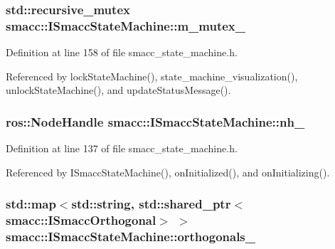 \subsubsection[{\texorpdfstring{m\+\_\+mutex\+\_\+}{m_mutex_}}]{\setlength{\rightskip}{0pt plus 5cm}std\+::recursive\+\_\+mutex smacc\+::\+I\+Smacc\+State\+Machine\+::m\+\_\+mutex\+\_\+\hspace{0.3cm}{\ttfamily [private]}}\hypertarget{classsmacc_1_1ISmaccStateMachine_aac785541646e5c517273bf31072505a1}{}\label{classsmacc_1_1ISmaccStateMachine_aac785541646e5c517273bf31072505a1}


Definition at line 158 of file smacc\+\_\+state\+\_\+machine.\+h.



Referenced by lock\+State\+Machine(), state\+\_\+machine\+\_\+visualization(), unlock\+State\+Machine(), and update\+Status\+Message().

\subsubsection[{\texorpdfstring{nh\+\_\+}{nh_}}]{\setlength{\rightskip}{0pt plus 5cm}ros\+::\+Node\+Handle smacc\+::\+I\+Smacc\+State\+Machine\+::nh\+\_\+\hspace{0.3cm}{\ttfamily [protected]}}\hypertarget{classsmacc_1_1ISmaccStateMachine_ad8877bcca9dbb345fe72cca839c93dd3}{}\label{classsmacc_1_1ISmaccStateMachine_ad8877bcca9dbb345fe72cca839c93dd3}


Definition at line 137 of file smacc\+\_\+state\+\_\+machine.\+h.



Referenced by I\+Smacc\+State\+Machine(), on\+Initialized(), and on\+Initializing().

\subsubsection[{\texorpdfstring{orthogonals\+\_\+}{orthogonals_}}]{\setlength{\rightskip}{0pt plus 5cm}std\+::map$<$std\+::string, std\+::shared\+\_\+ptr$<${\bf smacc\+::\+I\+Smacc\+Orthogonal}$>$ $>$ smacc\+::\+I\+Smacc\+State\+Machine\+::orthogonals\+\_\+\hspace{0.3cm}{\ttfamily [protected]}}\hypertarget{classsmacc_1_1ISmaccStateMachine_acc5944f313bc6ce1637c632243a511f2}{}\label{classsmacc_1_1ISmaccStateMachine_acc5944f313bc6ce1637c632243a511f2}


